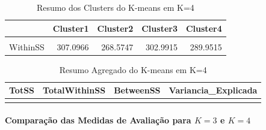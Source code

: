 \documentclass[
  letterpaper,
  DIV=11,
  numbers=noendperiod]{scrartcl}
\let\oldparagraph\paragraph
\renewcommand{\paragraph}[1]{\oldparagraph{#1}\mbox{}}
\begin{document}
\begin{longtable}[t]{lrrrr}
\caption{\label{tab:unnamed-chunk-37}Resumo dos Clusters do K-means em K=4}\\
\toprule
  & Cluster1 & Cluster2 & Cluster3 & Cluster4\\
\midrule
\cellcolor{gray!15}{Cluster} & \cellcolor{gray!15}{1.0000} & \cellcolor{gray!15}{2.0000} & \cellcolor{gray!15}{3.0000} & \cellcolor{gray!15}{4.0000}\\
WithinSS & 307.0966 & 268.5747 & 302.9915 & 289.9515\\
\bottomrule
\end{longtable}
\endgroup{}

\begingroup\fontsize{12}{14}\selectfont

\begin{longtable}[t]{rrrr}
\caption{\label{tab:unnamed-chunk-37}Resumo Agregado do K-means em K=4}\\
\toprule
TotSS & TotalWithinSS & BetweenSS & Variancia\_Explicada\\
\midrule
\cellcolor{gray!15}{2301} & \cellcolor{gray!15}{1168.614} & \cellcolor{gray!15}{1132.386} & \cellcolor{gray!15}{49.21276}\\
\bottomrule
\end{longtable}
\endgroup{}

\paragraph{\texorpdfstring{Comparação das Medidas de Avaliação para
\(K=3\) e
\(K=4\)}{Comparação das Medidas de Avaliação para K=3 e K=4}}\label{comparauxe7uxe3o-das-medidas-de-avaliauxe7uxe3o-para-k3-e-k4}
\end{document}
